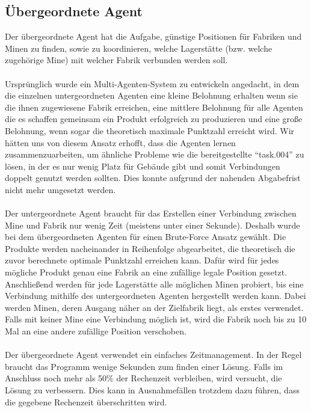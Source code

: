 \subsection{Übergeordnete Agent}
Der übergeordnete Agent hat die Aufgabe, günstige Positionen für Fabriken und Minen zu finden, sowie zu koordinieren, welche Lagerstätte (bzw. welche zugehörige Mine) mit welcher Fabrik verbunden werden soll. 
\\\\
Ursprünglich wurde  ein Multi-Agenten-System zu entwickeln angedacht, in dem die einzelnen untergeordneten Agenten eine kleine Belohnung erhalten wenn sie die ihnen zugewiesene Fabrik erreichen, eine mittlere Belohnung für alle Agenten die es schaffen gemeinsam ein Produkt erfolgreich zu produzieren und eine große Belohnung, wenn sogar die theoretisch maximale Punktzahl erreicht wird. Wir hätten uns von diesem Ansatz erhofft, dass die Agenten lernen zusammenzuarbeiten, um ähnliche Probleme wie die bereitgestellte “task.004” zu lösen, in der es nur wenig Platz für Gebäude gibt und somit Verbindungen doppelt genutzt werden sollten. Dies konnte aufgrund der nahenden Abgabefrist nicht mehr umgesetzt werden.
\\\\
Der untergeordnete Agent braucht für das Erstellen einer Verbindung zwischen Mine und Fabrik nur wenig Zeit (meistens unter einer Sekunde). Deshalb wurde  bei dem übergeordneten Agenten für einen Brute-Force Ansatz gewählt. Die Produkte werden nacheinander in Reihenfolge abgearbeitet, die theoretisch die zuvor berechnete optimale Punktzahl erreichen kann. Dafür wird für jedes mögliche Produkt genau eine Fabrik an eine zufällige legale Position gesetzt. Anschließend werden für jede Lagerstätte alle möglichen Minen probiert, bis eine Verbindung mithilfe des untergeordneten Agenten hergestellt werden kann. Dabei werden Minen, deren Ausgang näher an der Zielfabrik liegt, als erstes verwendet. Falls mit keiner Mine eine Verbindung möglich ist, wird die Fabrik noch bis zu 10 Mal an eine andere zufällige Position verschoben. 
\\\\
Der übergeordnete Agent verwendet ein einfaches Zeitmanagement. In der Regel braucht das Programm wenige Sekunden zum finden einer Lösung. Falls im Anschluss noch mehr als 50\% der Rechenzeit verbleiben, wird versucht, die Lösung zu verbessern. Dies kann in Ausnahmefällen trotzdem dazu führen, dass die gegebene Rechenzeit überschritten wird. 
\\\\
